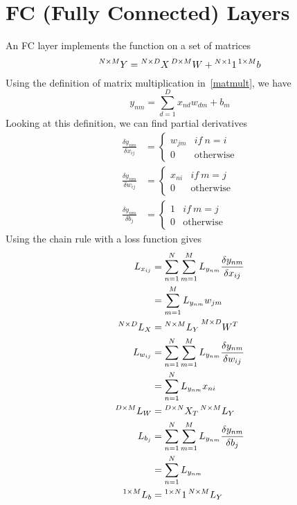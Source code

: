 \documentclass{book}
\numberwithin{equation}{subsection}
\begin{document}
\section{FC (Fully Connected) Layers}
An FC layer implements the function on a set of matrices
\begin{equation}
    \prescript{N\times M}{}{Y} = \prescript{N\times D}{}{X}\prescript{D\times M}{}{W} + \prescript{N\times1}{}{1}\prescript{1\times M}{}{b}
\end{equation}
Using the definition of matrix multiplication in~\ref{matmult}, we have
\begin{equation}
y_{nm} = \sum_{d=1}^D x_{nd} w_{dm}+b_m
\end{equation}
Looking at this definition, we can find partial derivatives 
\begin{align}
    \frac{\delta y_{nm}}{\delta x_{ij}} &= \begin{cases}
        w_{jm} & if\ n=i\\
        0 & \text{otherwise}
    \end{cases}\\
    \frac{\delta y_{nm}}{\delta w_{ij}} &= \begin{cases}
        x_{ni} & if\ m=j\\
        0 & \text{otherwise}
    \end{cases}\\
    \frac{\delta y_{nm}}{\delta b_{j}} &= \begin{cases}
        1 & if\ m=j\\
        0 & \text{otherwise}
    \end{cases}
\end{align}
Using the chain rule with a loss function gives
\begin{align}
    L_{x_{ij}} &= \sum_{n=1}^N\sum_{m=1}^M L_{y_{nm}} \frac{\delta y_{nm}}{\delta x_{ij}}\\
    &= \sum_{m=1}^M L_{y_{nm}} w_{jm}\\
    \prescript{N\times D}{}{L_X} &= \prescript{N\times M}{}{L_Y}\prescript{M\times D}{}{W^T}\\
    L_{w_{ij}} &= \sum_{n=1}^N\sum_{m=1}^M L_{y_{nm}} \frac{\delta y_{nm}}{\delta w_{ij}}\\
    &= \sum_{n=1}^N L_{y_{nm}} x_{ni}\\
    \prescript{D\times M}{}{L_W} &= \prescript{D\times N}{}{X_T}\prescript{N\times M}{}{L_Y}\\
    L_{b_{j}} &= \sum_{n=1}^N\sum_{m=1}^M L_{y_{nm}} \frac{\delta y_{nm}}{\delta b_{j}}\\
    &= \sum_{n=1}^N L_{y_{nm}}\\
    \prescript{1\times M}{}{L_b} &= \prescript{1\times N}{}{1}\prescript{N\times M}{}{L_Y}
\end{align}
\end{document}
